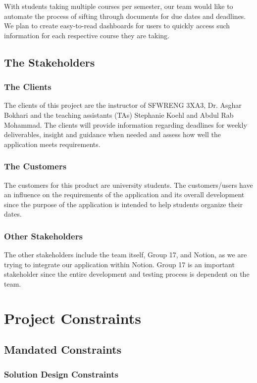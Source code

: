 \documentclass[12pt, titlepage]{article}
\begin{document}
With students taking multiple courses per semester, our team would like to automate the process of sifting through documents for due dates and deadlines. We plan to create easy-to-read dashboards for users to quickly access such information for each respective course they are taking. 

\subsection{The Stakeholders}

\subsubsection{The Clients}
The clients of this project are the instructor of SFWRENG 3XA3, Dr. Asghar Bokhari and the teaching assistants (TAs) Stephanie Koehl and Abdul Rab Mohammad. The clients will provide information regarding deadlines for weekly deliverables, insight and guidance when needed and assess how well the application meets requirements.  

\subsubsection{The Customers}
The customers for this product are university students. The customers/users have an influence on the requirements of the application and its overall development since the purpose of the application is intended to help students organize their dates.  

\subsubsection{Other Stakeholders}
The other stakeholders include the team itself, Group 17, and Notion, as we are trying to integrate our application within Notion. Group 17 is an important stakeholder since the entire development and testing process is dependent on the team. 

\section{Project Constraints}
\subsection{Mandated Constraints}
\subsubsection{Solution Design Constraints}
\end{document}
